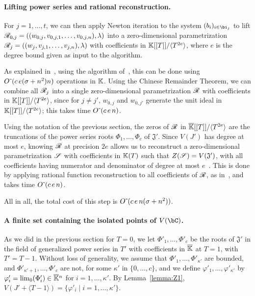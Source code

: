 \documentclass[12pt]{article}
\begin{document}
\paragraph{Lifting power series and rational reconstruction.}
For $j=1,\dots,t$, we can then apply Newton iteration to the system
$(b_i)_{i \in \bi_j}$ to lift
$\mathscr{R}_{0,j}=((w_{0,j},v_{0,j,1},\dots,v_{0,j,n}),\lambda)$ into a
zero-dimensional parametrization
$\mathscr{R}_{j}=((w_{j},v_{j,1},\dots,v_{j,n}),\lambda)$ with coefficients
in $\mathbb{K}[[T]]/\langle T^{2e}\rangle$, where $e$ is the degree bound given
as input to the algorithm.

As explained in~\cite[Section~2.2]{SaSc16}, using the algorithm
of~\cite{GiLeSa01}, this can be done using ${O}{\,\tilde{ }\,}(c\,e (\sigma+n^2)n)$
operations in $\mathbb{K}$.  Using the Chinese Remainder Theorem, we can
combine all $\mathscr{R}_{j}$ into a single zero-dimensional parametrization
$\mathscr{R}$ with coefficients in $\mathbb{K}[[T]]/\langle T^{2e}\rangle$, since
for $j\ne j'$, $w_{0,j}$ and $w_{0,j'}$ generate the unit ideal in
$\mathbb{K}[[T]]/\langle T^{2e}\rangle$; this takes time 
${O}{\,\tilde{ }\,}(c\,e\,n)$.

Using the notation of the previous section, the zeros of $\mathscr{R}$ in
$\overline{\mathbb{K}}[[T]]/\langle T^{2e}\rangle$ are the truncations of the power
series roots $\Phi_1,\dots,\Phi_c$ of $\mathfrak{J}'$. Since $V(J')$ has
degree at most $e$, knowing $\mathscr{R}$ at precision $2e$ allows us to
reconstruct a zero-dimensional parametrization $\mathscr{S}$ with
coefficients in $\mathbb{K}(T)$ such that $Z(\mathscr{S})=V(\mathfrak{J}')$,
with all coefficients having numerator and denominator of degree at
most $e$~\cite[Theorem~1]{Schost03}.  This is done by applying
rational function reconstruction to all coefficients of $\mathscr{R}$, as
in~\cite{Schost03}, and takes time ${O}{\,\tilde{ }\,}(c\,e\,n)$.

All in all, the total cost of this step is ${O}{\,\tilde{ }\,}(c\,e\,n (\sigma+n^2))$.

\paragraph{A finite set containing the isolated points of $V(\bC)$.}
As we did in the previous section for $T=0$, we let
$\Phi'_1,\dots,\Phi'_c$ be the roots of $\mathfrak{J}'$ in the field
of generalized power series in $T'$ with coefficients in $\overline{\mathbb{K}}$ at
$T=1$, with $T'=T-1$. Without loss of generality, we assume that
$\Phi'_1,\dots,\Phi'_{\kappa'}$ are bounded, and
$\Phi'_{\kappa'+1},\dots,\Phi'_c$ are not, for some $\kappa'$ in
$\{0,\dots,c\}$, and we define $\varphi'_1,\dots,\varphi'_{\kappa'}$
by $\varphi'_i=\lim_0(\Phi'_i)\in\overline{\mathbb{K}}{}^n$ for $i=1,\dots,\kappa'$.
By Lemma~\ref{lemma:Z1},
$V(J' + \langle T-1\rangle) = \{ \varphi'_i \mid i=1,\dots,\kappa'\}$.
\end{document}
